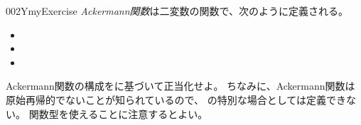 \documentclass[index]{subfiles}
\begin{document}
\begin{myBlock}{002Y}{myExercise}
  \emph{Ackermann関数}は二変数の関数\myInlineMath{\myAckermann \myElemOf
    \myNat \myFunType \myNat \myFunType \myNat}で、次のように定義される。
  \begin{itemize}
  \item {}
  \item {}
  \item {}
  \end{itemize}
  Ackermann関数の構成をに基づいて正当化せよ。
  ちなみに、Ackermann関数は原始再帰的でないことが知られているので、
  の特別な場合としては定義できない。
  関数型を使えることに注意するとよい。
\end{myBlock}
\end{document}
